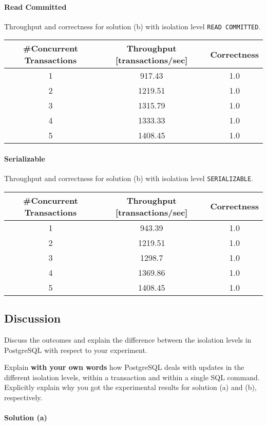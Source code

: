\documentclass[11pt]{scrartcl}
\begin{document}
\paragraph{Read Committed}

Throughput and correctness for solution (b) with isolation level \lstinline[style=dbtsql]{READ COMMITTED}.

\begin{table}[H]
  \centering
  \begin{tabular}{c|c|c}
    \#Concurrent Transactions & Throughput [transactions/sec] & Correctness
      \tabularnewline
    \hline
    1 & 917.43 & 1.0 \tabularnewline
    2 & 1219.51 & 1.0 \tabularnewline
    3 & 1315.79 & 1.0 \tabularnewline
    4 & 1333.33 & 1.0 \tabularnewline
    5 & 1408.45 & 1.0 \tabularnewline
  \end{tabular}
\end{table}

\paragraph{Serializable}

Throughput and correctness for solution (b) with isolation level \lstinline[style=dbtsql]{SERIALIZABLE}.

\begin{table}[H]
  \centering
  \begin{tabular}{c|c|c}
    \#Concurrent Transactions & Throughput [transactions/sec] & Correctness
      \tabularnewline
    \hline
    1 & 943.39 & 1.0 \tabularnewline
    2 & 1219.51 & 1.0 \tabularnewline
    3 & 1298.7 & 1.0 \tabularnewline
    4 & 1369.86 & 1.0 \tabularnewline
    5 & 1408.45 & 1.0 \tabularnewline
  \end{tabular}
\end{table}

\subsection*{Discussion}

Discuss the outcomes and explain the difference between the isolation levels in PostgreSQL with respect to your experiment.

Explain \textbf{with your own words} how PostgreSQL deals with updates in the different isolation levels, within a transaction and within a single SQL command. Explicitly explain why you got the experimental results for solution (a) and (b), respectively.

\paragraph{Solution (a)}\mbox{}
\end{document}
